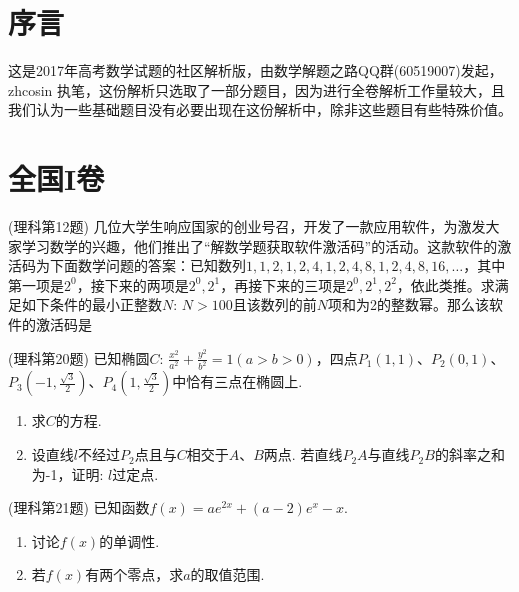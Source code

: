 \documentclass{ctexart}
\title{\kaishu{2017年高考数学试题选析}}
\author{数学解题之路QQ群(60519007)}
\date{更新于: \today}
\begin{document}
\maketitle

\tableofcontents

\section{序言}
\label{sec:preface}

这是2017年高考数学试题的社区解析版，由数学解题之路QQ群(60519007)发起，zhcosin 执笔，这份解析只选取了一部分题目，因为进行全卷解析工作量较大，且我们认为一些基础题目没有必要出现在这份解析中，除非这些题目有些特殊价值。

\section{全国I卷}
\label{sec:nation-1}

\begin{exercise}(理科第12题)
  几位大学生响应国家的创业号召，开发了一款应用软件，为激发大家学习数学的兴趣，他们推出了“解数学题获取软件激活码”的活动。这款软件的激活码为下面数学问题的答案：已知数列$1,1,2,1,2,4,1,2,4,8,1,2,4,8,16,\ldots$，其中第一项是$2^0$，接下来的两项是$2^0,2^1$，再接下来的三项是$2^0,2^1,2^2$，依此类推。求满足如下条件的最小正整数$N$: $N>100$且该数列的前$N$项和为2的整数幂。那么该软件的激活码是 \fkh 

\end{exercise}

\begin{exercise}(理科第20题)
  已知椭圆$C$: $\frac{x^2}{a^2}+\frac{y^2}{b^2}=1(a>b>0)$，四点$P_1(1,1)$、$P_2(0,1)$、$P_3(-1,\frac{\sqrt{3}}{2})$、$P_4(1,\frac{\sqrt{3}}{2})$中恰有三点在椭圆上.
  \begin{enumerate}
  \item 求$C$的方程.
  \item 设直线$l$不经过$P_2$点且与$C$相交于$A$、$B$两点. 若直线$P_2A$与直线$P_2B$的斜率之和为-1，证明: $l$过定点.
  \end{enumerate}
\end{exercise}

\begin{exercise}(理科第21题)
  已知函数$f(x)=ae^{2x}+(a-2)e^x-x$.
  \begin{enumerate}
  \item 讨论$f(x)$的单调性.
  \item 若$f(x)$有两个零点，求$a$的取值范围.
  \end{enumerate}
\end{exercise}
\end{document}
